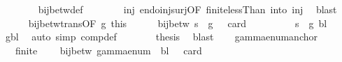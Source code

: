 \begin{isabellebody}
\ \ \ \ \ \ \isamarkupfalse%
\ bij{\isacharunderscore}{\kern0pt}betw{\isacharunderscore}{\kern0pt}def\isanewline
\ \ \ \ \ \ \isamarkupfalse%
\ inj\ endo{\isacharunderscore}{\kern0pt}inj{\isacharunderscore}{\kern0pt}surj{\isacharbrackleft}{\kern0pt}OF\ finite{\isacharunderscore}{\kern0pt}lessThan\ into\ inj{\isacharbrackright}{\kern0pt}\ \isamarkupfalse%
\ blast\isanewline
\ \ \ \ \isamarkupfalse%
\ bij{\isacharunderscore}{\kern0pt}betw{\isacharunderscore}{\kern0pt}trans{\isacharbrackleft}{\kern0pt}OF\ g\ this{\isacharbrackright}{\kern0pt}\isanewline
\ \ \ \ \isamarkupfalse%
\ {\isachardoublequoteopen}bij{\isacharunderscore}{\kern0pt}betw\ {\isacharparenleft}{\kern0pt}{\isacharquery}{\kern0pt}s\ {\isasymcirc}\ g{\isacharparenright}{\kern0pt}\ {\isasymGamma}\ {\isacharbraceleft}{\kern0pt}{\isachardot}{\kern0pt}{\isachardot}{\kern0pt}{\isacharless}{\kern0pt}\ card\ {\isasymGamma}{\isacharbraceright}{\kern0pt}{\isachardoublequoteclose}\ \isakeywordONE{{\isachardot}{\kern0pt}}\isamarkupfalse%
\isanewline
\ \ \ \ \isamarkupfalse%
\ \isamarkupfalse%
\ {\isachardoublequoteopen}{\isacharparenleft}{\kern0pt}{\isacharquery}{\kern0pt}s\ {\isasymcirc}\ g{\isacharparenright}{\kern0pt}\ bl\ {\isacharequal}{\kern0pt}\ {}{\isachardoublequoteclose}\ \isamarkupfalse%
\ gbl\ \isamarkupfalse%
\ {\isacharparenleft}{\kern0pt}auto\ simp{\isacharcolon}{\kern0pt}\ comp{\isacharunderscore}{\kern0pt}def{\isacharparenright}{\kern0pt}\isanewline
\ \ \ \ \isamarkupfalse%
\ \isamarkupfalse%
\ {\isacharquery}{\kern0pt}thesis\ \isamarkupfalse%
\ blast\isanewline
\ \ \isamarkupfalse%
\isanewline
{}\isamarkupfalse%
%
\endisatagproof
{\isafoldproof}%
%
\isadelimproof
\isanewline
%
\endisadelimproof
\isanewline
{}\isamarkupfalse%
\ gamma{\isacharunderscore}{\kern0pt}enum{\isacharunderscore}{\kern0pt}anchor{\isacharcolon}{\kern0pt}\isanewline
\ \ \ {\isachardoublequoteopen}finite\ {\isasymGamma}{\isachardoublequoteclose}\isanewline
\ \ \ {\isachardoublequoteopen}bij{\isacharunderscore}{\kern0pt}betw\ {\isacharparenleft}{\kern0pt}gamma{\isacharunderscore}{\kern0pt}enum\ {\isasymGamma}\ bl{\isacharparenright}{\kern0pt}\ {\isasymGamma}\ {\isacharbraceleft}{\kern0pt}{\isachardot}{\kern0pt}{\isachardot}{\kern0pt}{\isacharless}{\kern0pt}\ card\ {\isasymGamma}{\isacharbraceright}{\kern0pt}\isanewline

\end{isabellebody}
